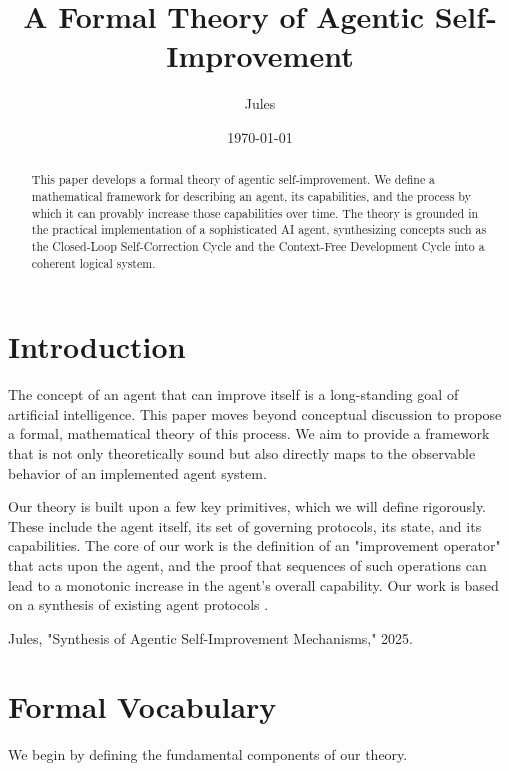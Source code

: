 \documentclass{article}
\title{A Formal Theory of Agentic Self-Improvement}
\author{Jules}
\date{\today}
\begin{document}
\maketitle

\begin{abstract}
This paper develops a formal theory of agentic self-improvement. We define a mathematical framework for describing an agent, its capabilities, and the process by which it can provably increase those capabilities over time. The theory is grounded in the practical implementation of a sophisticated AI agent, synthesizing concepts such as the Closed-Loop Self-Correction Cycle and the Context-Free Development Cycle into a coherent logical system.
\end{abstract}

\section{Introduction}

The concept of an agent that can improve itself is a long-standing goal of artificial intelligence. This paper moves beyond conceptual discussion to propose a formal, mathematical theory of this process. We aim to provide a framework that is not only theoretically sound but also directly maps to the observable behavior of an implemented agent system.

Our theory is built upon a few key primitives, which we will define rigorously. These include the agent itself, its set of governing protocols, its state, and its capabilities. The core of our work is the definition of an "improvement operator" that acts upon the agent, and the proof that sequences of such operations can lead to a monotonic increase in the agent's overall capability. Our work is based on a synthesis of existing agent protocols \cite{synthesis}.

\begin{thebibliography}{9}

Jules, "Synthesis of Agentic Self-Improvement Mechanisms," 2025.

\end{thebibliography}

\section{Formal Vocabulary}

We begin by defining the fundamental components of our theory.
\end{document}
